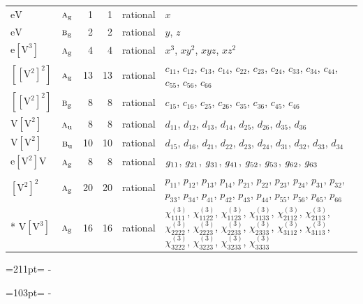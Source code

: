 \documentclass[10pt,a4paper]{article}
\newcommand{\needspace}[1]{\par\penalty-100\begingroup\dimen0=#1\relax\dimen2=\pagegoal
  \advance\dimen2-\pagetotal\ifdim\dimen0>\dimen2\relax\ifdim\dimen2>0pt\vfil\break\fi\fi
  \endgroup}
\numberwithin{equation}{section}
\newcommand{\irr}[1]{\text{\normalfont\scshape #1}}
\newcommand{\ptag}[1]{\mathrm{#1}}
\newcommand{\jahn}[1]{\mathrm{#1}}
\newlength{\fillwidth}\newlength{\cellwidth}\newlength{\colwidth}
\begin{document}
{\begin{longtable}{@{}llrrl>{\RaggedRight\arraybackslash}p{\fillwidth}@{}}
$\jahn{eV}$ & $\irr{a}_{\ptag{g}}$ & 1 & 1 & rational & $x$\\
$\jahn{eV}$ & $\irr{b}_{\ptag{g}}$ & 2 & 2 & rational & $y$, $z$\\
$\jahn{e[V^{3}]}$ & $\irr{a}_{\ptag{g}}$ & 4 & 4 & rational & $x^{3}$, $xy^{2}$, $xyz$, $xz^{2}$\\
$\jahn{[[V^{2}]^{2}]}$ & $\irr{a}_{\ptag{g}}$ & 13 & 13 & rational & $c_{11}$, $c_{12}$, $c_{13}$, $c_{14}$, $c_{22}$, $c_{23}$, $c_{24}$, $c_{33}$, $c_{34}$, $c_{44}$, $c_{55}$, $c_{56}$, $c_{66}$\\
$\jahn{[[V^{2}]^{2}]}$ & $\irr{b}_{\ptag{g}}$ & 8 & 8 & rational & $c_{15}$, $c_{16}$, $c_{25}$, $c_{26}$, $c_{35}$, $c_{36}$, $c_{45}$, $c_{46}$\\
$\jahn{V[V^{2}]}$ & $\irr{a}_{\ptag{u}}$ & 8 & 8 & rational & $d_{11}$, $d_{12}$, $d_{13}$, $d_{14}$, $d_{25}$, $d_{26}$, $d_{35}$, $d_{36}$\\
$\jahn{V[V^{2}]}$ & $\irr{b}_{\ptag{u}}$ & 10 & 10 & rational & $d_{15}$, $d_{16}$, $d_{21}$, $d_{22}$, $d_{23}$, $d_{24}$, $d_{31}$, $d_{32}$, $d_{33}$, $d_{34}$\\
$\jahn{e[V^{2}]V}$ & $\irr{a}_{\ptag{g}}$ & 8 & 8 & rational & $\mathnormal{g}_{11}$, $\mathnormal{g}_{21}$, $\mathnormal{g}_{31}$, $\mathnormal{g}_{41}$, $\mathnormal{g}_{52}$, $\mathnormal{g}_{53}$, $\mathnormal{g}_{62}$, $\mathnormal{g}_{63}$\\
$\jahn{[V^{2}]^{2}}$ & $\irr{a}_{\ptag{g}}$ & 20 & 20 & rational & $p_{11}$, $p_{12}$, $p_{13}$, $p_{14}$, $p_{21}$, $p_{22}$, $p_{23}$, $p_{24}$, $p_{31}$, $p_{32}$, $p_{33}$, $p_{34}$, $p_{41}$, $p_{42}$, $p_{43}$, $p_{44}$, $p_{55}$, $p_{56}$, $p_{65}$, $p_{66}$\\*
$\jahn{V[V^{3}]}$ & $\irr{a}_{\ptag{g}}$ & 16 & 16 & rational & $\chi^{(3)}_{1111}$, $\chi^{(3)}_{1122}$, $\chi^{(3)}_{1123}$, $\chi^{(3)}_{1133}$, $\chi^{(3)}_{2112}$, $\chi^{(3)}_{2113}$, $\chi^{(3)}_{2222}$, $\chi^{(3)}_{2223}$, $\chi^{(3)}_{2233}$, $\chi^{(3)}_{2333}$, $\chi^{(3)}_{3112}$, $\chi^{(3)}_{3113}$, $\chi^{(3)}_{3222}$, $\chi^{(3)}_{3223}$, $\chi^{(3)}_{3233}$, $\chi^{(3)}_{3333}$\\
\bottomrule\end{longtable}}
\needspace{211pt}
\needspace{103pt}
\end{document}
